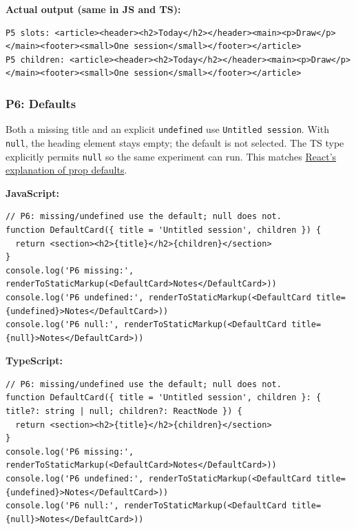 \documentclass[
  11pt,
]{article}
\newcommand{\passthrough}[1]{#1}
\begin{document}
\textbf{Actual output (same in JS and TS):}

\begin{lstlisting}
P5 slots: <article><header><h2>Today</h2></header><main><p>Draw</p></main><footer><small>One session</small></footer></article>
P5 children: <article><header><h2>Today</h2></header><main><p>Draw</p></main><footer><small>One session</small></footer></article>
\end{lstlisting}

\subsubsection{P6: Defaults}\label{p6-defaults}

Both a missing title and an explicit \passthrough{\lstinline!undefined!}
use \passthrough{\lstinline!Untitled session!}. With
\passthrough{\lstinline!null!}, the heading element stays empty; the
default is not selected. The TS type explicitly permits
\passthrough{\lstinline!null!} so the same experiment can run. This
matches
\href{https://react.dev/learn/passing-props-to-a-component\#specifying-a-default-value-for-a-prop}{React's
explanation of prop defaults}.

\textbf{JavaScript:}

\begin{lstlisting}
// P6: missing/undefined use the default; null does not.
function DefaultCard({ title = 'Untitled session', children }) {
  return <section><h2>{title}</h2>{children}</section>
}
console.log('P6 missing:', renderToStaticMarkup(<DefaultCard>Notes</DefaultCard>))
console.log('P6 undefined:', renderToStaticMarkup(<DefaultCard title={undefined}>Notes</DefaultCard>))
console.log('P6 null:', renderToStaticMarkup(<DefaultCard title={null}>Notes</DefaultCard>))
\end{lstlisting}

\textbf{TypeScript:}

\begin{lstlisting}
// P6: missing/undefined use the default; null does not.
function DefaultCard({ title = 'Untitled session', children }: { title?: string | null; children?: ReactNode }) {
  return <section><h2>{title}</h2>{children}</section>
}
console.log('P6 missing:', renderToStaticMarkup(<DefaultCard>Notes</DefaultCard>))
console.log('P6 undefined:', renderToStaticMarkup(<DefaultCard title={undefined}>Notes</DefaultCard>))
console.log('P6 null:', renderToStaticMarkup(<DefaultCard title={null}>Notes</DefaultCard>))
\end{lstlisting}
\end{document}

